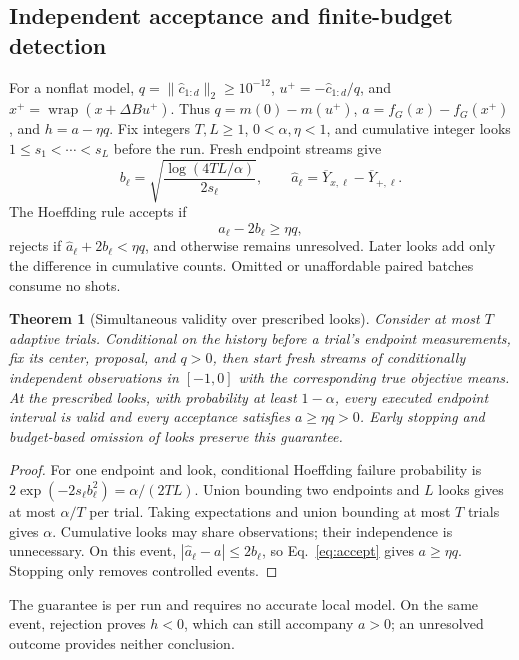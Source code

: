 \documentclass[11pt]{article}
\newcommand{\norm}[1]{\lVert #1\rVert}
\newtheorem{theorem}{Theorem}
\begin{document}
\subsection{Independent acceptance and finite-budget detection}
For a nonflat model, $q=\norm{\widehat c_{1:d}}_2\ge10^{-12}$,
$u^+=-\widehat c_{1:d}/q$, and $x^+=\operatorname{wrap}(x+\Delta Bu^+)$.
Thus $q=m(0)-m(u^+)$, $a=f_G(x)-f_G(x^+)$, and $h=a-\eta q$.
Fix integers $T,L\ge1$, $0<\alpha,\eta<1$, and cumulative integer
looks $1\le s_1<\cdots<s_L$ before the run. Fresh endpoint streams give
\begin{equation}
 b_\ell=\sqrt{\frac{\log(4TL/\alpha)}{2s_\ell}},\qquad
 \widehat a_\ell=\overline Y_{x,\ell}-\overline Y_{+,\ell}.
 \label{eq:bound}
\end{equation}
The Hoeffding rule accepts if
\begin{equation}
 \widehat a_\ell-2b_\ell\ge\eta q,
 \label{eq:accept}
\end{equation}
rejects if $\widehat a_\ell+2b_\ell<\eta q$, and otherwise remains unresolved.
Later looks add only the difference in cumulative counts. Omitted or
unaffordable paired batches consume no shots.

\begin{theorem}[Simultaneous validity over prescribed looks]
\label{thm:acceptance}
Consider at most $T$ adaptive trials. Conditional on the history before a
trial's endpoint measurements, fix its center, proposal, and $q>0$, then
start fresh streams of conditionally independent observations in $[-1,0]$
with the corresponding true objective means. At the prescribed looks,
with probability at least $1-\alpha$, every executed endpoint interval
is valid and every acceptance satisfies $a\ge\eta q>0$.
Early stopping and budget-based omission of looks preserve this guarantee.
\end{theorem}
\begin{proof}
For one endpoint and look, conditional Hoeffding failure probability is
$2\exp(-2s_\ell b_\ell^2)=\alpha/(2TL)$. Union bounding two endpoints
and $L$ looks gives at most $\alpha/T$ per trial. Taking expectations and
union bounding at most $T$ trials gives $\alpha$. Cumulative looks may
share observations; their independence is unnecessary. On this event,
$|\widehat a_\ell-a|\le2b_\ell$, so Eq.~\eqref{eq:accept} gives
$a\ge\eta q$. Stopping only removes controlled events.
\end{proof}
The guarantee is per run and requires no accurate local model. On the same
event, rejection proves $h<0$, which can still accompany $a>0$; an unresolved
outcome provides neither conclusion.
\end{document}

